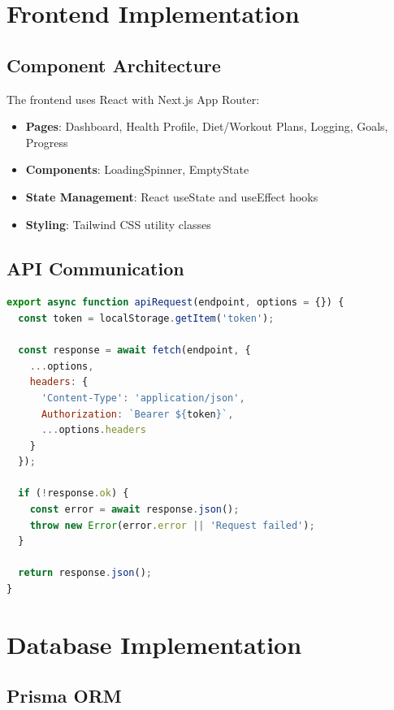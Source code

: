 \section{Frontend Implementation}

\subsection{Component Architecture}

The frontend uses React with Next.js App Router:

\begin{itemize}
    \item \textbf{Pages}: Dashboard, Health Profile, Diet/Workout Plans, Logging, Goals, Progress
    \item \textbf{Components}: LoadingSpinner, EmptyState
    \item \textbf{State Management}: React useState and useEffect hooks
    \item \textbf{Styling}: Tailwind CSS utility classes
\end{itemize}

\subsection{API Communication}

\begin{lstlisting}[language=JavaScript, caption=API Client Helper]
export async function apiRequest(endpoint, options = {}) {
  const token = localStorage.getItem('token');
  
  const response = await fetch(endpoint, {
    ...options,
    headers: {
      'Content-Type': 'application/json',
      Authorization: `Bearer ${token}`,
      ...options.headers
    }
  });
  
  if (!response.ok) {
    const error = await response.json();
    throw new Error(error.error || 'Request failed');
  }
  
  return response.json();
}
\end{lstlisting}

\section{Database Implementation}

\subsection{Prisma ORM}

